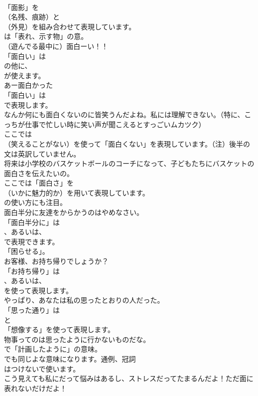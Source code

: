 \documentclass[8pt]{extreport}
\begin{document}
\begin{CJK}{UTF8}{min}
\\	「面影」を 
\\	（名残、痕跡）と 
\\	（外見）を組み合わせて表現しています。
\\	は「表れ、示す物」の意。	
\\	（遊んでる最中に）面白ーい！！ 
\\	「面白い」は
\\	の他に、
\\	が使えます。	
\\	あー面白かった 
\\	「面白い」は 
\\	で表現します。	
\\	なんか何にも面白くないのに皆笑うんだよね。私には理解できない。（特に、こっちが仕事で忙しい時に笑い声が聞こえるとすっごいムカツク） 
\\	ここでは
\\	（笑えることがない）を使って「面白くない」を表現しています。（注）後半の文は英訳していません。	
\\	将来は小学校のバスケットボールのコーチになって、子どもたちにバスケットの面白さを伝えたいの。 
\\	ここでは「面白さ」を 
\\	（いかに魅力的か）を用いて表現しています。
\\	の使い方にも注目。	
\\	面白半分に友達をからかうのはやめなさい。 
\\	「面白半分に」は
\\	、あるいは、
\\	で表現できます。
\\	「困らせる」。	
\\	お客様、お持ち帰りでしょうか？ 
\\	「お持ち帰り」は
\\	、あるいは、
\\	を使って表現します。	
\\	やっぱり、あなたは私の思ったとおりの人だった。 
\\	「思った通り」は
\\	と
\\	「想像する」を使って表現します。	
\\	物事ってのは思ったように行かないものだな。 
\\	で「計画したように」の意味。
\\	でも同じよな意味になります。通例、冠詞
\\	はつけないで使います。	
\\	こう見えても私にだって悩みはあるし、ストレスだってたまるんだよ！ただ面に表れないだけだよ！ 

\end{CJK}
\end{document}

